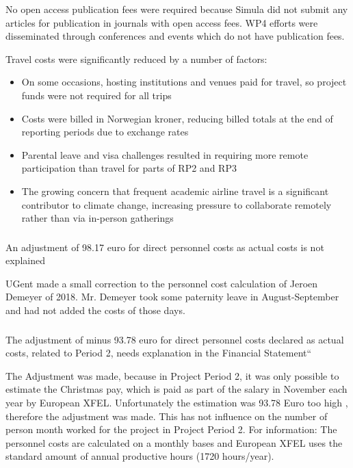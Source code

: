\begin{EUcomment}
No open access publication fees were required because Simula did not submit any articles for publication in journals with open access fees.
WP4 efforts were disseminated through conferences and events which do not have publication fees.

Travel costs were significantly reduced by a number of factors:
\begin{itemize}
  \item On some occasions, hosting institutions and venues paid for travel, so project funds were not required for all trips
  \item Costs were billed in Norwegian kroner, reducing billed totals at the end of reporting periods due to exchange rates
  \item Parental leave and visa challenges resulted in requiring more remote participation
    than travel for parts of RP2 and RP3
  \item The growing concern that frequent academic airline travel is a significant contributor to climate change,
    increasing pressure to collaborate remotely rather than via in-person gatherings
\end{itemize}

\subsubsection{}
\begin{EUcomment}
An adjustment of 98.17 euro for direct personnel costs as actual costs is not explained 
\end{EUcomment}
UGent made a small correction to the personnel cost calculation of Jeroen Demeyer of 2018. Mr. Demeyer took some paternity leave in August-September and had not added the costs of those days.

\subsubsection{}

\begin{EUcomment}
The adjustment of minus 93.78 euro for direct personnel costs declared as actual costs, related to Period 2, needs explanation in the 
Financial Statement“
\end{EUcomment}

The Adjustment was made, because in Project Period 2, it was only possible to estimate the Christmas pay, which is paid as part of the salary in November each year by European XFEL. Unfortunately the estimation was 93.78 Euro too high , therefore the adjustment was made. This has not influence on the number of person month worked for the project in Project Period 2. For information: The personnel costs are calculated on a monthly bases and European XFEL uses the standard amount of  annual productive hours (1720 hours/year).


\end{EUcomment}

